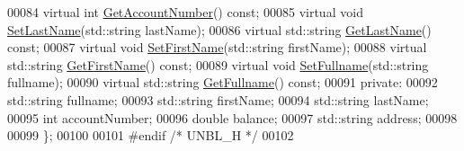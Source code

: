 \begin{DoxyCode}
00084     \textcolor{keyword}{virtual} \textcolor{keywordtype}{int} \hyperlink{class_u_n_b_l_a44a84fb7fe8778e3048921581049c715}{GetAccountNumber}() \textcolor{keyword}{const};
00085     \textcolor{keyword}{virtual} \textcolor{keywordtype}{void} \hyperlink{class_u_n_b_l_abd683db339dffe71af3993a8a5cb5929}{SetLastName}(std::string lastName);
00086     \textcolor{keyword}{virtual} std::string \hyperlink{class_u_n_b_l_a27f19f2af5e1abd33b5c63f16b493f6c}{GetLastName}() \textcolor{keyword}{const};
00087     \textcolor{keyword}{virtual} \textcolor{keywordtype}{void} \hyperlink{class_u_n_b_l_aef061d2cba01bcd752e9305dc374cabc}{SetFirstName}(std::string firstName);
00088     \textcolor{keyword}{virtual} std::string \hyperlink{class_u_n_b_l_ae89215b95f2e11aa70f9c8bbfd55c10c}{GetFirstName}() \textcolor{keyword}{const};
00089     \textcolor{keyword}{virtual} \textcolor{keywordtype}{void} \hyperlink{class_u_n_b_l_a1b3f52c44756930c1ee4acb06f2634ad}{SetFullname}(std::string fullname);
00090     \textcolor{keyword}{virtual} std::string \hyperlink{class_u_n_b_l_a4292e9cafc42be3d9f4f3d6221bc9638}{GetFullname}() \textcolor{keyword}{const};
00091 \textcolor{keyword}{private}:
00092     std::string fullname;
00093     std::string firstName;
00094     std::string lastName;
00095     \textcolor{keywordtype}{int} accountNumber;
00096     \textcolor{keywordtype}{double} balance;
00097     std::string address;
00098 
00099 \};
00100 
00101 \textcolor{preprocessor}{#endif }\textcolor{comment}{/* UNBL\_H */}\textcolor{preprocessor}{}
00102 
\end{DoxyCode}
